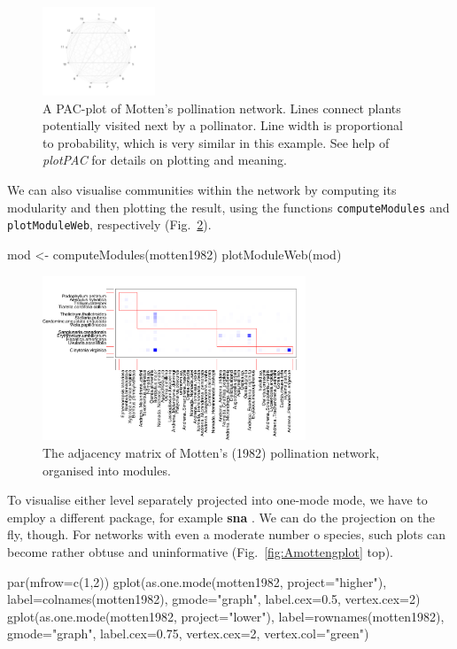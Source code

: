 \documentclass[a4paper, 11pt]{article}\usepackage[]{graphicx}\usepackage[]{color}
\newcommand{\package}[1]{\textbf{#1}}
\begin{document}
\begin{figure}
	\includegraphics[width=0.3\textwidth]{figures/motten1982_PACplot}
	\caption{A PAC-plot of Motten's \citeyear{Motten1982} pollination network. Lines connect plants potentially visited next by a pollinator. Line width is proportional to probability, which is very similar in this example. See help of \emph{plotPAC} for details on plotting and meaning.}
	\label{fig:AplotPAC}
\end{figure}
%
We can also visualise communities within the network by computing its modularity and then plotting the result, using the functions \texttt{computeModules} and \texttt{plotModuleWeb}, respectively (Fig.~\ref{fig:Amoduleplot}).
\begin{Schunk}
\begin{Sinput}
mod <- computeModules(motten1982)
plotModuleWeb(mod)
\end{Sinput}
\end{Schunk}
\begin{figure}[h]
\centering
	\includegraphics[width=0.7\textwidth]{figures/motten1982_moduleplot}
	\caption{The adjacency matrix of Motten's (1982) pollination network, organised into modules.}
	\label{fig:Amoduleplot}
\end{figure}
%
To visualise either level separately projected into one-mode mode, we have to employ a different package, for example \package{sna} \citep{Butts2013}. We can do the projection on the fly, though. For networks with even a moderate number o species, such plots can become rather obtuse and uninformative (Fig.~\ref{fig:Amottengplot} top).
\begin{Schunk}
\begin{Sinput}
par(mfrow=c(1,2))
gplot(as.one.mode(motten1982, project="higher"), 
 label=colnames(motten1982), gmode="graph", 
label.cex=0.5, vertex.cex=2)
gplot(as.one.mode(motten1982, project="lower"), 
	label=rownames(motten1982), gmode="graph", 
	label.cex=0.75, vertex.cex=2, vertex.col="green")
\end{Sinput}
\end{Schunk}
\end{document}
